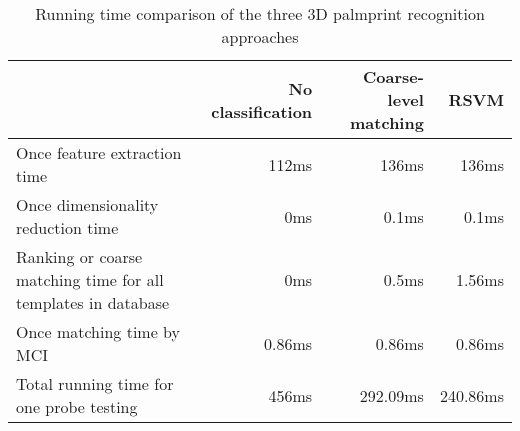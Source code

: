 \begin{table}[htbp]
  \centering
  \caption{Running time comparison of the three 3D palmprint recognition approaches}
    \begin{tabular}{lrrr}
    \toprule
          & No classification & Coarse-level matching & RSVM \\
    \midrule
    \multicolumn{1}{p{5cm}}{Once feature extraction time} & 112ms & 136ms & 136ms \\
    \multicolumn{1}{p{5cm}}{Once dimensionality reduction time} & 0ms   & 0.1ms & 0.1ms \\
    \multicolumn{1}{p{5cm}}{Ranking or coarse matching time for all templates in database} & 0ms   & 0.5ms & 1.56ms \\
    \multicolumn{1}{p{5cm}}{Once matching time by MCI} & 0.86ms & 0.86ms & 0.86ms \\
    \multicolumn{1}{p{5cm}}{Total running time for one probe testing} & 456ms & 292.09ms & 240.86ms \\
    \bottomrule
    \end{tabular}%
  \label{tab:experiment:time}%
\end{table}%

